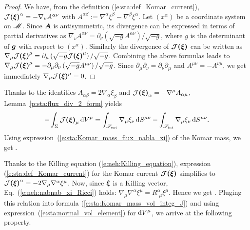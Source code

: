 \begin{proof}
We have, from the definition (\ref{e:sta:def_Komar_current}),
$\mathcal{J}\textbf{(}\bm{\xi}\textbf{)}^\alpha = - \nabla_\nu A^{\alpha\nu}$ with
$A^{\alpha\beta} :=  \nabla^\alpha \xi^\beta - \nabla^\beta \xi^\alpha$.
Let $(x^\alpha)$ be a coordinate system on $\mathscr{M}$.
Since $\bm{A}$ is antisymmetric, its divergence can be expressed in terms of partial derivatives as
$\nabla_\nu A^{\alpha\nu} = \partial_\nu \left( \sqrt{-g} A^{\alpha\nu} \right) / \sqrt{-g}$,
where $g$ is the determinant of $\bm{g}$ with respect to $(x^\alpha)$.
Similarly the divergence of $\bm{\mathcal{J}}\textbf{(}\bm{\xi}\textbf{)}$ can be written as
$\nabla_\mu \mathcal{J}\textbf{(}\bm{\xi}\textbf{)}^\mu  =  \partial_\mu \left( \sqrt{-g} \mathcal{J}\textbf{(}\bm{\xi}\textbf{)}^\mu \right) / \sqrt{-g}$.
Combining the above formulas leads to
$\nabla_\mu \mathcal{J}\textbf{(}\bm{\xi}\textbf{)}^\mu = - \partial_\mu \partial_\nu  \left( \sqrt{-g} A^{\mu\nu} \right) /  \sqrt{-g}$.
Since $\partial_\mu \partial_\nu = \partial_\nu \partial_\mu$ and $A^{\mu\nu} = - A^{\nu\mu}$,
we get immediately $\nabla_\mu \mathcal{J}\textbf{(}\bm{\xi}\textbf{)}^\mu = 0$.
\end{proof}

Thanks to the identities $A_{\alpha\beta} = 2 \nabla_\alpha \xi_\beta$ and
$\mathcal{J}\textbf{(}\bm{\xi}\textbf{)}_\alpha = - \nabla^\mu A_{\alpha\mu}$, Lemma~\ref{p:sta:flux_div_2_form} yields
\[
   - \int_{\Sigma} \mathcal{J}\textbf{(}\bm{\xi}\textbf{)}_\mu \, \mathrm{d} V^\mu
    = \int_{\mathscr{S}_{\rm ext}} \nabla_\mu \xi_\nu \, \mathrm{d} S^{\mu\nu}
      - \int_{\mathscr{S}_{\rm int}} \nabla_\mu \xi_\nu \, \mathrm{d} S^{\mu\nu} .
\]
Using expression~(\ref{e:sta:Komar_mass_flux_nabla_xi}) of the Komar mass,
we get
\be \label{e:sta:Komar_mass_vol_integ_J}
     .
\ee

Thanks to the Killing equation (\ref{e:neh:Killing_equation}),
expression (\ref{e:sta:def_Komar_current}) for the Komar current $\bm{\mathcal{J}}\textbf{(}\bm{\xi}\textbf{)}$
simplifies to  $\mathcal{J}\textbf{(}\bm{\xi}\textbf{)}^\alpha = - 2 \nabla_\mu \nabla^\alpha \xi^\mu$.
Now, since $\bm{\xi}$ is a Killing vector, Eq.~(\ref{e:neh:nabnab_xi_Ricci}) holds:
$\nabla_\mu \nabla^\alpha \xi^\mu = R^\alpha_{\ \, \mu} \xi^\mu$. Hence we get
\be \label{e:sta:J_Killing_Ricci}
     .
\ee
Pluging this relation into formula (\ref{e:sta:Komar_mass_vol_integ_J})
and using expression~(\ref{e:sta:normal_vol_element}) for $\mathrm{d} V^\mu$,
we arrive at the following property.

